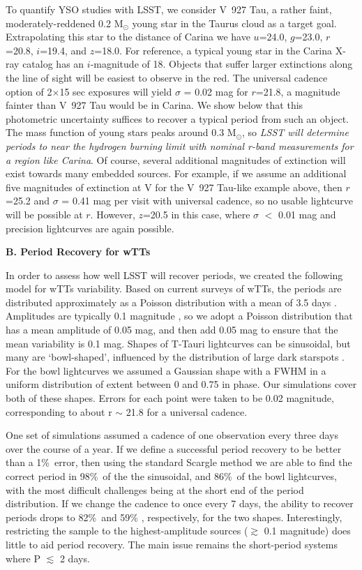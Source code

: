 To quantify YSO studies with LSST, we consider V~927 Tau,
a rather faint, moderately-reddened 0.2 M$_\odot$ young star in the Taurus cloud
as a target goal. Extrapolating this star
to the distance of Carina we have $u$=24.0, $g$=23.0, $r$=20.8, $i$=19.4, and $z$=18.0. For reference,
a typical young star in the Carina X-ray catalog has an $i$-magnitude of 18.
Objects that suffer larger extinctions along the line of sight will
be easiest to observe in the red. The universal cadence option of 2$\times$15 sec
exposures will yield $\sigma$ = 0.02 mag for $r$=21.8, a magnitude fainter than
V~927 Tau would be in Carina. We show below that this photometric uncertainty
suffices to recover a typical period from such an object. The mass function
of young stars peaks around 0.3 M$_\odot$, so {\it LSST will
determine periods to near the hydrogen burning limit with nominal r-band measurements
for a region like Carina}. Of course, several additional magnitudes of extinction will
exist towards many embedded sources. For example, if we assume an additional five magnitudes
of extinction at V for the V~927 Tau-like example above,
then $r$=25.2 and $\sigma$ = 0.41 mag per visit with universal cadence,
so no usable lightcurve will be possible at $r$.
However, $z$=20.5 in this case, where $\sigma$ $<$ 0.01 mag and precision
lightcurves are again possible.

{\bf B. Period Recovery for wTTs}

In order to assess how well LSST will recover periods, we created the following
model for wTTs variability.  Based on current surveys of wTTs, the periods are
distributed approximately as a Poisson distribution with a mean of 3.5 days
\citep{Affer2013}.
Amplitudes are typically 0.1 magnitude \citep{Grankin2008},
so we adopt a Poisson distribution
that has a mean amplitude of 0.05 mag, and then add 0.05 mag to ensure that
the mean variability is 0.1 mag. Shapes of T-Tauri lightcurves can be sinusoidal,
but many are `bowl-shaped', influenced by the distribution of large dark starspots
\citep{Alencar2010}.
For the bowl lightcurves we assumed a Gaussian shape with a FWHM in a uniform
distribution of extent between 0 and 0.75 in phase.
Our simulations cover both of these shapes.
Errors for each point were taken to be 0.02 magnitude, corresponding to
about r $\sim$ 21.8 for a universal cadence.

One set of simulations assumed a cadence of
one observation every three days over the course of a year.
If we define a successful period recovery to be better than a 1\%\ error, then
using the standard Scargle method \citep{Horne1986}
we are able to find the correct period in
98\%\ of the the sinusoidal, and 86\%\ of the bowl lightcurves, with the most
difficult challenges being at the short end of the period distribution. If we change
the cadence to once every 7 days, the ability to recover periods drops to
82\%\ and 59\% , respectively, for the two shapes. Interestingly, restricting the
sample to the highest-amplitude sources ($\gtrsim$ 0.1 magnitude) does little
to aid period recovery. The main issue remains the short-period systems where
P $\lesssim$ 2 days.

